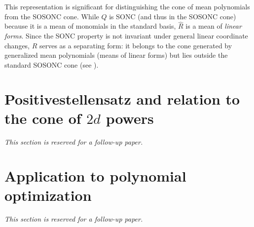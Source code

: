 \documentclass{article}
\begin{document}
This representation is significant for distinguishing the cone of mean polynomials from the SOSONC cone. While $Q$ is 
SONC (and thus in the SOSONC cone) because it is a mean of monomials in the standard basis, $\hat{R}$ is a mean of 
\emph{linear forms}. Since the SONC property is not invariant under general linear coordinate changes, $\hat{R}$ 
serves as a separating form: it belongs to the cone generated by generalized mean polynomials (means of linear forms) 
but lies outside the standard SOSONC cone (see \cite[page 31 and Lemma 4.2.5, page 107]{MSc01}).


\section{Positivestellensatz and relation to the cone of $2d$ powers}
\label{s06}

\emph{This section is reserved for a follow-up paper.}

\section{Application to polynomial optimization}
\label{s07}

\emph{This section is reserved for a follow-up paper.}
\end{document}
